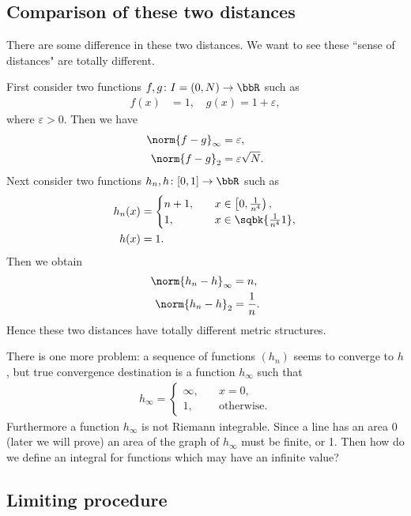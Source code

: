 \documentclass[openany, a4paper, oneside]{jsbook}
\begin{document}
\subsection{Comparison of these two distances}

There are some difference in these two distances.
We want to see these ``sense of distances" are totally different.

First consider two functions $f,g \colon I = (0, N) \to \bbR$ such as
\begin{align}
 f (x)
 &=
 1, \quad
 g (x)
 =
 1 + \varepsilon,
\end{align}
where $\varepsilon > 0$.
Then we have
\begin{align}
 \norm{f - g}_{\infty}
 &=
 \varepsilon, \\
 \norm{f - g}_{2}
 &=
 \varepsilon \sqrt{N}.
\end{align}
Next consider two functions $h_n, h \colon [0, 1] \to \bbR$ such as
\begin{align}
 h_n (x)
 &=
 \begin{cases}
  n+1, \quad &x \in \left[0, \frac{1}{n^4} \right), \\
  1, \quad &x \in \sqbk{\frac{1}{n^4} 1},
 \end{cases} \\
 h (x)
 &= 1.
\end{align}
Then we obtain
\begin{align}
 \norm{h_n - h}_{\infty}
 &=
 n, \\
 \norm{h_n - h}_2
 &=
 \frac{1}{n}.
\end{align}
Hence these two distances have totally different metric structures.

There is one more problem: a sequence of functions $(h_n)$ seems to converge to $h$,
but true convergence destination is a function $h_{\infty}$ such that
\begin{align}
 h_{\infty}
 =
 \begin{cases}
  \infty, \quad &x = 0, \\
  1, \quad &\text{otherwise}.
 \end{cases}
\end{align}
Furthermore a function $h_{\infty}$ is not Riemann integrable.
Since a line has an area 0 (later we will prove) an area of the graph of $h_{\infty}$ must be finite, or 1.
Then how do we define an integral for functions which may have an infinite value?
\subsection{Limiting procedure}
\end{document}
